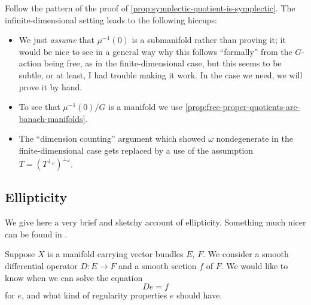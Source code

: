 \documentclass[12pt,letterpaper,reqno]{article}
\numberwithin{equation}{section}
\newcommand{\ti}[1]{\textit{#1}}
\begin{document}
\begin{pf} 

Follow the pattern of the proof
of \autoref{prop:symplectic-quotient-is-symplectic}.
The infinite-dimensional setting leads to the following
hiccups: 
\begin{itemize}

\item 
We just \ti{assume} that $\mu^{-1}(0)$ is a submanifold
rather than proving it; it would be nice to see in a general
way why this follows ``formally'' from the $G$-action being
free, as in the finite-dimensional case, but 
this seems to be subtle, or at least, I had trouble
making it work. In the case we need, we will
prove it by hand.

\item To see that $\mu^{-1}(0) / G$ is a manifold
we use \autoref{prop:free-proper-quotients-are-banach-manifolds}. 

\item The ``dimension counting'' argument which showed
$\omega$ nondegenerate in the finite-dimensional case
gets replaced by a use of the assumption $T = (T^{\perp_\omega})^{\perp_\omega}$.

\end{itemize}
\end{pf}



\subsection{Ellipticity} \label{sec:ellipticity}

We give here a very brief and sketchy account of 
ellipticity. Something much nicer can be found in \cite{MR2359489}.

Suppose $X$ is a manifold carrying
vector bundles $E$, $F$. We 
consider a smooth differential operator $D: E \to F$
and a smooth section $f$ of $F$.
We would like to know when we can solve the equation
\begin{equation} \label{eq:Def}
 D e = f
\end{equation}
for $e$, and what kind of regularity properties
$e$ should have.
\end{document}
